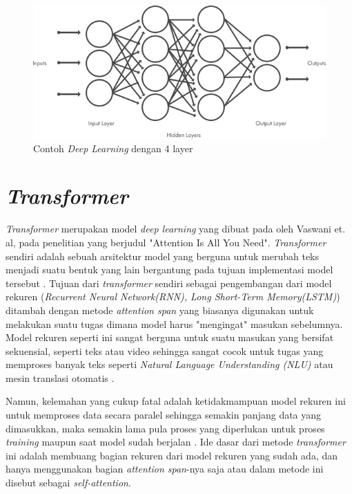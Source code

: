 \begin{figure}[ht]
    \centering
    \includegraphics[width=\textwidth]{gambar/deeplearning_layer.png}
    \caption{Contoh \textit{Deep Learning} dengan 4 layer \cite{mathwork_deeplearning}}
    \label{fig: deeplearning_layer}
\end{figure}

\section{\textit{Transformer}}

\textit{Transformer} merupakan model \textit{deep learning} yang dibuat pada oleh Vaswani et. al, pada penelitian yang berjudul "Attention Is All You Need". \textit{Transformer} sendiri adalah sebuah arsitektur model yang berguna untuk merubah teks menjadi suatu bentuk yang lain bergantung pada tujuan implementasi model tersebut \cite{attention_is_all_you_need}. Tujuan dari \textit{transformer} sendiri sebagai pengembangan dari model rekuren (\textit {Recurrent Neural Network(RNN), Long Short-Term Memory(LSTM)}) ditambah dengan metode \textit{attention span} yang biasanya digunakan untuk melakukan suatu tugas dimana model harus "mengingat" masukan sebelumnya. Model rekuren seperti ini sangat berguna untuk suatu masukan yang bersifat sekuensial, seperti teks atau video sehingga sangat cocok untuk tugas yang memproses banyak teks seperti \textit{Natural Language Understanding (NLU)} atau mesin translasi otomatis \cite{lion_transformer}.

Namun, kelemahan yang cukup fatal adalah ketidakmampuan model rekuren ini untuk memproses data secara paralel sehingga semakin panjang data yang dimasukkan, maka semakin lama pula proses yang diperlukan untuk proses \textit{training} maupun saat model sudah berjalan \cite{attention_is_all_you_need}. Ide dasar dari metode \textit{transformer} ini adalah membuang bagian rekuren dari model rekuren yang sudah ada, dan hanya menggunakan bagian \textit{attention span}-nya saja atau dalam metode ini disebut sebagai \textit{self-attention}.

